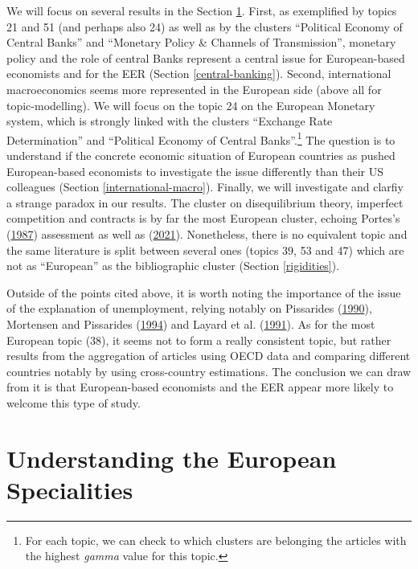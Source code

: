 \documentclass[]{elsarticle} %
\begin{document}
We will focus on several results in the Section
\ref{understanding-specialities}. First, as exemplified by topics 21 and
51 (and perhaps also 24) as well as by the clusters ``Political Economy
of Central Banks'' and ``Monetary Policy \& Channels of Transmission'',
monetary policy and the role of central Banks represent a central issue
for European-based economists and for the EER (Section
\ref{central-banking}). Second, international macroeconomics seems more
represented in the European side (above all for topic-modelling). We
will focus on the topic 24 on the European Monetary system, which is
strongly linked with the clusters ``Exchange Rate Determination'' and
``Political Economy of Central Banks''.\footnote{For each topic, we can
  check to which clusters are belonging the articles with the highest
  \emph{gamma} value for this topic.} The question is to understand if
the concrete economic situation of European countries as pushed
European-based economists to investigate the issue differently than
their US colleagues (Section \ref{international-macro}). Finally, we
will investigate and clarfiy a strange paradox in our results. The
cluster on disequilibrium theory, imperfect competition and contracts is
by far the most European cluster, echoing Portes's
(\protect\hyperlink{ref-portes1987}{1987}) assessment as well as
(\protect\hyperlink{ref-goutsmedt2021}{2021}). Nonetheless, there is no
equivalent topic and the same literature is split between several ones
(topics 39, 53 and 47) which are not as ``European'' as the
bibliographic cluster (Section \ref{rigidities}).

Outside of the points cited above, it is worth noting the importance of
the issue of the explanation of unemployment, relying notably on
Pissarides (\protect\hyperlink{ref-pissarides1990}{1990}), Mortensen and
Pissarides (\protect\hyperlink{ref-mortensen1994}{1994}) and Layard et
al. (\protect\hyperlink{ref-layard1991a}{1991}). As for the most
European topic (38), it seems not to form a really consistent topic, but
rather results from the aggregation of articles using OECD data and
comparing different countries notably by using cross-country
estimations. The conclusion we can draw from it is that European-based
economists and the EER appear more likely to welcome this type of study.

\hypertarget{understanding-specialities}{%
\section{Understanding the European
Specialities}\label{understanding-specialities}}
\end{document}
